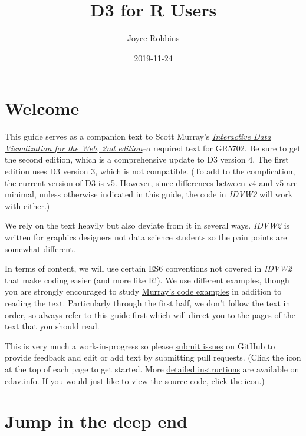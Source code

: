 \documentclass[openany]{book}
\title{D3 for R Users}
\author{Joyce Robbins}
\date{2019-11-24}
\begin{document}
\maketitle

{
\setcounter{tocdepth}{1}
\tableofcontents
}
\hypertarget{welcome}{%
\chapter*{Welcome}\label{welcome}}

\hypertarget{container}{}

This guide serves as a companion text to Scott Murray's \href{https://www.amazon.com/Interactive-Data-Visualization-Web-Introduction/dp/1491921285/}{\emph{Interactive Data Visualization for the Web, 2nd edition}}--a required text for GR5702. Be sure to get the second edition, which is a comprehensive update to D3 version 4. The first edition uses D3 version 3, which is not compatible. (To add to the complication, the current version of D3 is v5. However, since differences between v4 and v5 are minimal, unless otherwise indicated in this guide, the code in \emph{IDVW2} will work with either.)

We rely on the text heavily but also deviate from it in several ways. \emph{IDVW2} is written for graphics designers not data science students so the pain points are somewhat different.

In terms of content, we will use certain ES6 conventions not covered in \emph{IDVW2} that make coding easier (and more like R!). We use different examples, though you are strongly encouraged to study \href{https://github.com/alignedleft/d3-book/releases}{Murray's code examples} in addition to reading the text. Particularly through the first half, we don't follow the text in order, so always refer to this guide first which will direct you to the pages of the text that you should read.

This is very much a work-in-progress so please \href{https://github.com/jtr13/d3book/issues}{submit issues} on GitHub to provide feedback and edit or add text by submitting pull requests. (Click the icon at the top of each page to get started. More \href{https://edav.info/contribute.html\#step-2-click-the-edit-button}{detailed instructions} are available on edav.info. If you would just like to view the source code, click the icon.)

\hypertarget{jump}{%
\chapter{Jump in the deep end }\label{jump}}
\end{document}
